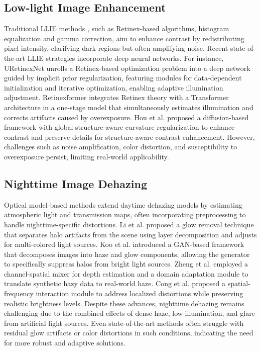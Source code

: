 \subsection{Low-light Image Enhancement}
%
    Traditional LLIE methods \cite{land1977retinex,guo2016lime,pizer1987adaptive}, such as Retinex-based algorithms, histogram equalization and gamma correction, aim to enhance contrast by redistributing pixel intensity, clarifying dark regions but often amplifying noise. Recent state-of-the-art LLIE strategies incorporate deep neural networks. For instance, URetinexNet \cite{wu2022uretinex} unrolls a Retinex-based optimization problem into a deep network guided by implicit prior regularization, featuring modules for data-dependent initialization and iterative optimization, enabling adaptive illumination adjustment. Retinexformer \cite{cai2023retinexformer} integrates Retinex theory with a Transformer architecture in a one-stage model that simultaneously estimates illumination and corrects artifacts caused by overexposure. Hou et al. \cite{hou2024global} proposed a diffusion-based framework with global structure-aware curvature regularization to enhance contrast and preserve details for structure-aware contrast enhancement. However, challenges such as noise amplification, color distortion, and susceptibility to overexposure persist, limiting real-world applicability.
%    
\subsection{Nighttime Image Dehazing}
%
    Optical model-based methods \cite{zhang2014nighttime,li2015nighttime,zhang2017fast,pei2012nighttime} extend daytime dehazing models by estimating atmospheric light and transmission maps, often incorporating preprocessing to handle nighttime-specific distortions.  Li et al. \cite{li2015nighttime} proposed a glow removal technique  that separates halo artifacts from the scene using layer decomposition and adjusts for multi-colored light sources. Koo et al. \cite{koo2020nighttime} introduced a GAN-based framework that decomposes images into haze and glow components, allowing the generator to specifically suppress halos from bright light sources. Zheng et al. \cite{zheng20234k} employed a channel-spatial mixer for depth estimation and a domain adaptation module to translate synthetic hazy data to real-world haze. Cong et al. \cite{cong2024semi} proposed a spatial-frequency interaction module to address localized distortions while preserving realistic brightness levels. Despite these advances, nighttime dehazing remains challenging due to the combined effects of dense haze, low illumination, and glare from artificial light sources. Even state-of-the-art methods often struggle with residual glow artifacts or color distortions in such conditions, indicating the need for more robust and adaptive solutions.
    
